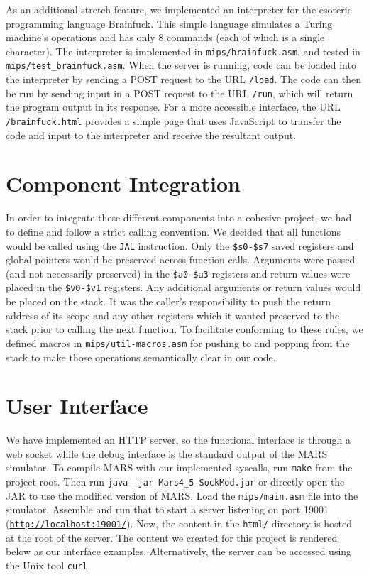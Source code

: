 \documentclass[journal,10pt]{IEEEtran}
\begin{document}
As an additional stretch feature, we implemented an interpreter for the
esoteric programming language Brainfuck\cite{Mpreu/preller}. This simple
language simulates a Turing machine's operations and has only 8 commands (each
of which is a single character). The interpreter is implemented in
\texttt{mips/brainfuck.asm}, and tested in \texttt{mips/test\_brainfuck.asm}.
When the server is running, code can be loaded into the interpreter by sending a
POST request to the URL \texttt{/load}. The code can then be run by sending
input in a POST request to the URL \texttt{/run}, which will return the program
output in its response. For a more accessible interface, the URL
\texttt{/brainfuck.html} provides a simple page that uses JavaScript to transfer
the code and input to the interpreter and receive the resultant output.

\section{Component Integration}

In order to integrate these different components into a cohesive project, we had
to define and follow a strict calling convention. We decided that all functions
would be called using the \texttt{JAL} instruction. Only the \texttt{\$s0-\$s7}
saved registers and global pointers would be preserved across function calls.
Arguments were passed (and not necessarily preserved) in the \texttt{\$a0-\$a3}
registers and return values were placed in the \texttt{\$v0-\$v1} registers. Any
additional arguments or return values would be placed on the stack. It was the
caller's responsibility to push the return address of its scope and any other
registers which it wanted preserved to the stack prior to calling the next
function. To facilitate conforming to these rules, we defined macros in
\texttt{mips/util-macros.asm} for pushing to and popping from the stack to make
those operations semantically clear in our code.

\section{User Interface}

We have implemented an HTTP server, so the functional interface is through a web
socket while the debug interface is the standard output of the MARS simulator.
To compile MARS with our implemented syscalls, run \texttt{make} from the
project root. Then run \texttt{java -jar Mars4\_5-SockMod.jar} or directly open
the JAR to use the modified version of MARS. Load the \texttt{mips/main.asm}
file into the simulator. Assemble and run that to start a server listening on
port 19001 (\texttt{\url{http://localhost:19001/}}). Now, the content in the
\texttt{html/} directory is hosted at the root of the server. The content we
created for this project is rendered below as our interface examples.
Alternatively, the server can be accessed using the Unix tool \texttt{curl}.
\end{document}

